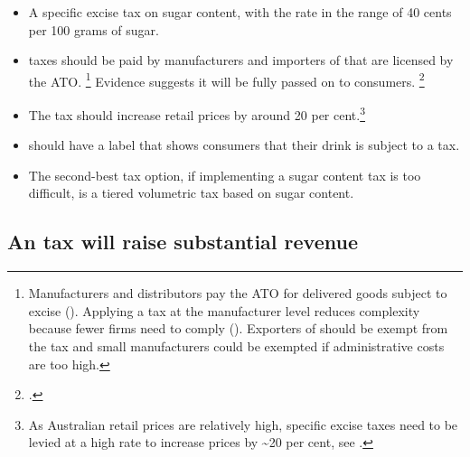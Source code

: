 \documentclass[embargoed]{grattan}
\begin{document}
\begin{itemize}
\item
  A specific excise tax on sugar content, with the rate in the range of 40 cents per 100 grams of sugar.
\item
  \SSB{} taxes should be paid by manufacturers and importers of \SSBs{} that are licensed by the ATO.%
\footnote{Manufacturers and distributors pay the ATO for delivered goods subject to excise (\textcite{Office2016Reportingexcisepaying}).
Applying a tax at the manufacturer level reduces complexity because fewer firms need to comply (\textcites{Freebairn2010Taxationobesity}{CnossenExcisetaxationAustralia}).
Exporters of \SSBs{} should be exempt from the tax and small manufacturers could be exempted if administrative costs are too high.} 
Evidence suggests it will be fully passed on to consumers.%
\footcites{Grogger2015Sodataxesprices}{Bergman2010Areexcisetaxes}{Berardi2016impactsodataxon}{Bonnet2013Taxincidencestrategic}{Solutions2016BestPracticesDesigning}
\item
  The tax should increase \SSB{} retail prices by around 20 per cent.\footnote{\textcite{Organization2016FiscalPoliciesDiet}
As Australian \SSB{} retail prices are relatively high, specific excise taxes need to be levied at a high rate to increase prices by \textasciitilde{}20 per cent, see \textcite{Long2015Costeffectivenesssugar}.}
\item
  \SSBs{} should have a label that shows consumers that their drink is subject to a tax.
\item
  The second-best tax option, if implementing a sugar content tax is too difficult, is a tiered volumetric tax based on sugar content.
\end{itemize}


\subsection{An \SSB{} tax will raise substantial revenue}\label{an-ssb-tax-will-raise-substantial-revenue}
\end{document}
